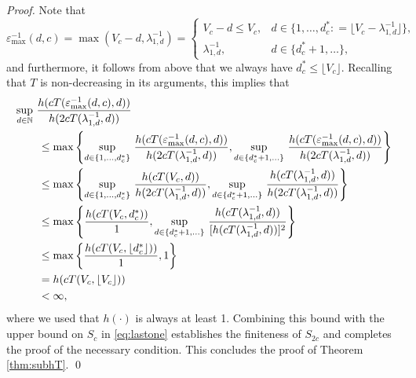 \documentclass[sort&compress]{elsarticle}
\begin{document}
\begin{proof}
Note that
\[
\varepsilon^{-1}_{\max}(d,c) = \max(V_c - d,\lambda_{1,d}^{-1})
= \begin{cases} V_c - d \le V_c, & d \in \{1, \ldots, d^*_c : = \lfloor V_c - \lambda_{1,d}^{-1} \rfloor\}, \\
\lambda_{1,d}^{-1}, & d \in \{d^*_c+1, \ldots\},
\end{cases}
\]
and furthermore, it follows from above that we always have $d^*_c\le \lfloor V_c \rfloor$.
Recalling that $T$ is non-decreasing in its arguments, this implies that
\begin{align*}
    \MoveEqLeft{\sup_{d\in\naturals} \,
		 \frac{ h(cT(\varepsilon^{-1}_{\max}(d,c),d))}{h(2cT(\lambda_{1,d}^{-1},d))}}\\
  &\le \max \left \{
  \sup_{d \in \{1, \ldots, d^*_c\}} \,
		 \frac{ h(cT(\varepsilon^{-1}_{\max}(d,c),d))}{h(2cT(\lambda_{1,d}^{-1},d))},
  \sup_{d\in \{d^*_c+1, \ldots \}} \,
		 \frac{ h(cT(\varepsilon^{-1}_{\max}(d,c),d))}{h(2cT(\lambda_{1,d}^{-1},d))}
  \right \} \\
  & \le \max \left \{
  \sup_{d \in \{1, \ldots, d^*_c\}}  \,
		 \frac{ h(cT(V_c,d))}{h(2cT(\lambda_{1,d}^{-1},d))}
  ,
  \sup_{d\in \{d^*_c+1, \ldots \}}  \,
		 \frac{ h(cT(\lambda_{1,d}^{-1},d))}{h(2cT(\lambda_{1,d}^{-1},d))}
  \right \}
  \\
  & \le \max \left \{
		 \frac{ h(cT(V_c,d^*_c))}{1},
  \sup_{d\in \{d^*_c+1, \ldots \}}  \,
		 \frac{ h(cT(\lambda_{1,d}^{-1},d))}{[h(cT(\lambda_{1,d}^{-1},d))]^2}
  \right \} \\
  & \le \max \left \{
		 \frac{ h(cT(V_c,\lfloor d^*_c \rfloor))}{1},
		 1
  \right \} \\
  & = h(cT(V_c,\lfloor V_c \rfloor))
		  \\
  & < \infty,
\end{align*}
where we used that $h(\cdot)$ is always at least 1. Combining this bound with the upper bound on $S_c$ in \eqref{eq:lastone} establishes the finiteness of $S_{2c}$ and completes the proof of the necessary condition.
This concludes the proof of Theorem \ref{thm:subhT}.
\qed
\end{proof}
\end{document}
